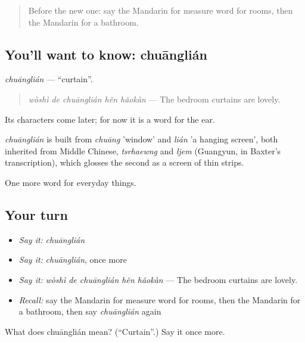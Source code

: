 \begin{quote}
Before the new one: say the Mandarin for measure word for rooms, then the Mandarin for a bathroom.
\end{quote}

\subsection*{You'll want to know: chuānglián}
\emph{chuānglián} — \textquotedblleft{}curtain\textquotedblright{}.

\begin{quote}
\emph{wòshì de chuānglián hěn hǎokàn} — The bedroom curtains are lovely.
\end{quote}

Its characters come later; for now it is a word for the ear.

\begin{cousinweb}
\emph{chuānglián} is built from \emph{chuāng} 'window' and \emph{lián} 'a hanging screen', both inherited from Middle Chinese, \emph{tsrhaewng} and \emph{ljem} (Guangyun, in Baxter's transcription), which glosses the second as a screen of thin strips.
\end{cousinweb}

\begin{grammarlens}[title={What you've built}]
One more word for everyday things.
\end{grammarlens}

\subsection*{Your turn}
\begin{itemize}
\raggedright
  \item \emph{Say it:} \emph{chuānglián}
  \item \emph{Say it:} \emph{chuānglián}, once more
  \item \emph{Say it:} \emph{wòshì de chuānglián hěn hǎokàn} — The bedroom curtains are lovely.
  \item \emph{Recall:} say the Mandarin for measure word for rooms, then the Mandarin for a bathroom, then say \emph{chuānglián} again
\end{itemize}

\begin{tcolorbox}[breakable,colback=teal!4,colframe=teal!35!black,title={Before you move on}]
What does chuānglián mean? (\textquotedblleft{}Curtain\textquotedblright{}.) Say it once more.
\end{tcolorbox}
